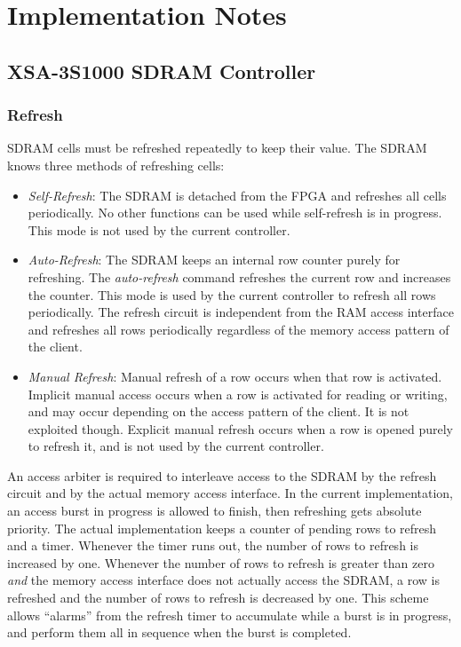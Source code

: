 \chapter{Implementation Notes}

\section{XSA-3S1000 SDRAM Controller}

\subsection{Refresh}

SDRAM cells must be refreshed repeatedly to keep their value. The SDRAM knows three methods of refreshing cells:
\begin{itemize}
\item {\it Self-Refresh}: The SDRAM is detached from the FPGA and refreshes all cells periodically. No other functions can be used while self-refresh is in progress. This mode is not used by the current controller.
\item {\it Auto-Refresh}: The SDRAM keeps an internal row counter purely for refreshing. The {\it auto-refresh} command refreshes the current row and increases the counter. This mode is used by the current controller to refresh all rows periodically. The refresh circuit is independent from the RAM access interface and refreshes all rows periodically regardless of the memory access pattern of the client.
\item {\it Manual Refresh}: Manual refresh of a row occurs when that row is activated. Implicit manual access occurs when a row is activated for reading or writing, and may occur depending on the access pattern of the client. It is not exploited though. Explicit manual refresh occurs when a row is opened purely to refresh it, and is not used by the current controller.
\end{itemize}

An access arbiter is required to interleave access to the SDRAM by the refresh circuit and by the actual memory access interface. In the current implementation, an access burst in progress is allowed to finish, then refreshing gets absolute priority. The actual implementation keeps a counter of pending rows to refresh and a timer. Whenever the timer runs out, the number of rows to refresh is increased by one. Whenever the number of rows to refresh is greater than zero {\it and} the memory access interface does not actually access the SDRAM, a row is refreshed and the number of rows to refresh is decreased by one. This scheme allows ``alarms'' from the refresh timer to accumulate while a burst is in progress, and perform them all in sequence when the burst is completed.

